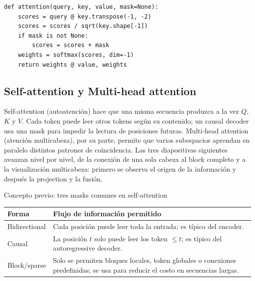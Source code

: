 
\begin{lstlisting}[caption={Pseudocódigo didáctico de scaled dot-product attention}]
def attention(query, key, value, mask=None):
    scores = query @ key.transpose(-1, -2)
    scores = scores / sqrt(key.shape[-1])
    if mask is not None:
        scores = scores + mask
    weights = softmax(scores, dim=-1)
    return weights @ value, weights
\end{lstlisting}


\subsection{Self-attention y Multi-head attention}

Self-attention (autoatención) hace que una misma secuencia produzca a la vez $Q$, $K$ y $V$. Cada token puede leer otros tokens según su contenido; un causal decoder usa una mask para impedir la lectura de posiciones futuras. Multi-head attention (atención multicabeza), por su parte, permite que varios subespacios aprendan en paralelo distintos patrones de coincidencia. Las tres diapositivas siguientes avanzan nivel por nivel, de la conexión de una sola cabeza al block completo y a la visualización multicabeza: primero se observa el origen de la información y después la projection y la fusión.


\begin{knowledgebox}{Concepto previo: tres masks comunes en self-attention}
\begin{tabularx}{\textwidth}{L{0.23\textwidth} X}
\toprule
Forma & Flujo de información permitido \\
\midrule
Bidirectional & Cada posición puede leer toda la entrada; es típico del encoder. \\
Causal & La posición $t$ solo puede leer los token $\le t$; es típico del autoregressive decoder. \\
Block/sparse & Solo se permiten bloques locales, token globales o conexiones predefinidas; se usa para reducir el costo en secuencias largas. \\
\bottomrule
\end{tabularx}
\end{knowledgebox}


